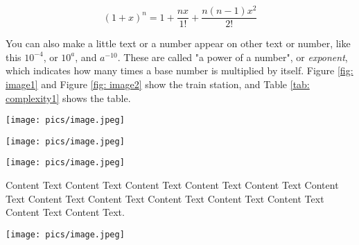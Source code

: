 \begin{Chapter}
\begin{equation} 
    \mbox{$(1+x)^n = 1 + \dfrac{nx}{1!} + \dfrac{n(n-1)x^2}{2!}$}
\end{equation}

You can also make a little text or a number appear on other text or number, like this $10^{-4}$, or $10^{a}$, and $a^{-10}$. These are called "a power of a number", or \textit{exponent}, which indicates how many times a base number is multiplied by itself. Figure \ref{fig: image1} and Figure \ref{fig: image2} show the train station, and Table \ref{tab: complexity1} shows the table.

\begin{figure*}[htbp]
    \centering
    \texttt{[image: pics/image.jpeg]}
    \caption{Cool train station}
    \label{fig: image1}
\end{figure*}

\begin{figure*}[htbp]
    \centering
    \texttt{[image: pics/image.jpeg]}
    \caption{This cool train station stands as a metaphor for life itself, everyone's waiting, no one knows when their train will arrive, and someone's always holding the wrong ticket. Yet, we all stand here pretending everything's fine, sipping overpriced coffee with quiet determination}
    \label{fig: image2}
\end{figure*}

\begin{figure*}[htbp]
    \centering
    \texttt{[image: pics/image.jpeg]}
    \caption{Cool train station}
    \label{fig: image2}
\end{figure*}

Content Text Content Text Content Text Content Text Content Text Content Text Content Text Content Text Content Text Content Text Content Text Content Text Content Text.

\begin{figure*}[htbp]
    \centering
    \texttt{[image: pics/image.jpeg]}
    \caption{Cool train station}
    \label{fig: image}
\end{figure*}

\end{Chapter}